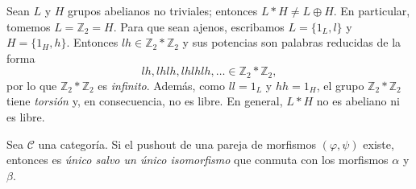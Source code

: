 \begin{ejemplo}
Sean $L$ y $H$ grupos abelianos no triviales; entonces $L \ast H \neq L \oplus H$. En particular, tomemos $L = \mathbb{Z}_2 = H$. Para que sean ajenos, escribamos $L = \{1_L, l\}$ y $H = \{1_H, h\}$. Entonces $lh \in \mathbb{Z}_2 \ast \mathbb{Z}_2$ y sus potencias son palabras reducidas de la forma
\[
lh,  lhlh,  lhlhlh,  \dots \in \mathbb{Z}_2 \ast \mathbb{Z}_2,
\]
por lo que $\mathbb{Z}_2 \ast \mathbb{Z}_2$ es \textit{infinito}. Además, como $ll = 1_L$ y $hh = 1_H$, el grupo $\mathbb{Z}_2 \ast \mathbb{Z}_2$ tiene \textit{torsión} y, en consecuencia, no es libre. En general, $L \ast H$ no es abeliano ni es libre.
\end{ejemplo}

\begin{prop}
Sea $\mathcal{C}$ una categoría. Si el pushout de una pareja de morfismos $(\varphi, \psi)$ existe, entonces es \textit{único salvo un único isomorfismo} que conmuta con los morfismos $\alpha$ y $\beta$.
\end{prop}

